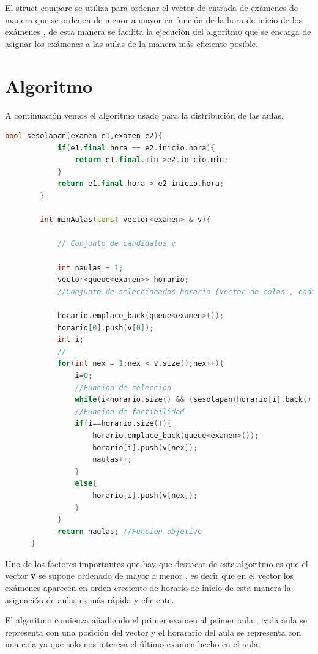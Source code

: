\documentclass[11pt,openany]{book}
\begin{document}
El struct compare se utiliza para ordenar el vector de entrada de exámenes de manera que se ordenen
de menor a mayor en función de la hora de inicio de los exámenes , de esta manera se facilita la
ejecución del algoritmo que se encarga de asignar los exámenes a las aulas de la manera más eficiente
posible.

\section{Algoritmo}

A continuación vemos el algoritmo usado para la distribución de las aulas.

\begin{lstlisting}[language=C++]
      bool sesolapan(examen e1,examen e2){
            if(e1.final.hora == e2.inicio.hora){
                return e1.final.min >e2.inicio.min;
            }
            return e1.final.hora > e2.inicio.hora;
        }
        
        int minAulas(const vector<examen> & v){
        
            // Conjunto de candidatos v
        
            int naulas = 1;
            vector<queue<examen>> horario;
            //Conjunto de seleccionados horario (vector de colas , cada cola es un aula)
            
            horario.emplace_back(queue<examen>());
            horario[0].push(v[0]);
            int i;
            //
            for(int nex = 1;nex < v.size();nex++){
                i=0;
                //Funcion de seleccion
                while(i<horario.size() && (sesolapan(horario[i].back(),v[nex]))){i++;}
                //Funcion de factibilidad
                if(i==horario.size()){
                    horario.emplace_back(queue<examen>());
                    horario[i].push(v[nex]);
                    naulas++;
                }
                else{
                    horario[i].push(v[nex]);
                }
            }
            return naulas; //Funcion objetivo 
      }
\end{lstlisting}

Uno de los factores importantes que hay que destacar de este algoritmo es que el vector \textbf{v} se supone 
ordenado de mayor a menor , es decir que en el vector los exámenes aparecen en orden creciente de 
horario de inicio de esta manera la asignación de aulas es más rápida y eficiente.

El algoritmo comienza añadiendo el primer examen al primer aula , cada aula se representa con una posición del vector 
y el horarario del aula se representa con una cola ya que solo nos interesa el último examen hecho en el aula.
\end{document}

